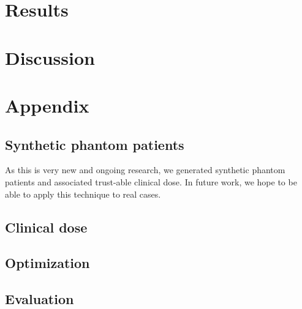 \section{Results}

\section{Discussion}



\section*{Appendix}

\subsection*{Synthetic phantom patients}
As this is very new and ongoing research, we generated synthetic phantom patients and associated trust-able clinical dose.
In future work, we hope to be able to apply this technique to real cases.

\subsection*{Clinical dose}

\subsection*{Optimization}

\subsection*{Evaluation}

